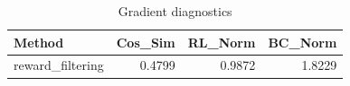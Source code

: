 \begin{table}[htbp]
\centering
\caption{Gradient diagnostics}
\label{tab:grad-diag}
\begin{tabular}{lrrr}
\toprule
\textbf{Method} & \textbf{Cos\_Sim} & \textbf{RL\_Norm} & \textbf{BC\_Norm} \\
\midrule
reward\_filtering & 0.4799 & 0.9872 & 1.8229 \\
\bottomrule
\end{tabular}
\end{table}